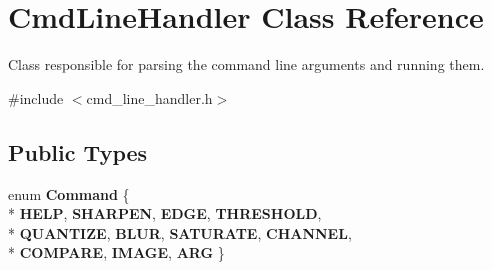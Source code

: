 \hypertarget{classCmdLineHandler}{}\section{Cmd\+Line\+Handler Class Reference}
\label{classCmdLineHandler}


Class responsible for parsing the command line arguments and running them.  




{\ttfamily \#include $<$cmd\+\_\+line\+\_\+handler.\+h$>$}

\subsection*{Public Types}
\begin{DoxyCompactItemize}
\item 
enum {\bfseries Command} \{ \\*
{\bfseries H\+E\+LP}, 
{\bfseries S\+H\+A\+R\+P\+EN}, 
{\bfseries E\+D\+GE}, 
{\bfseries T\+H\+R\+E\+S\+H\+O\+LD}, 
\\*
{\bfseries Q\+U\+A\+N\+T\+I\+ZE}, 
{\bfseries B\+L\+UR}, 
{\bfseries S\+A\+T\+U\+R\+A\+TE}, 
{\bfseries C\+H\+A\+N\+N\+EL}, 
\\*
{\bfseries C\+O\+M\+P\+A\+RE}, 
{\bfseries I\+M\+A\+GE}, 
{\bfseries A\+RG}
 \}\hypertarget{classCmdLineHandler_a4d5a261aab0b196f63ce37c80a3208ba}{}\label{classCmdLineHandler_a4d5a261aab0b196f63ce37c80a3208ba}

\end{DoxyCompactItemize}
